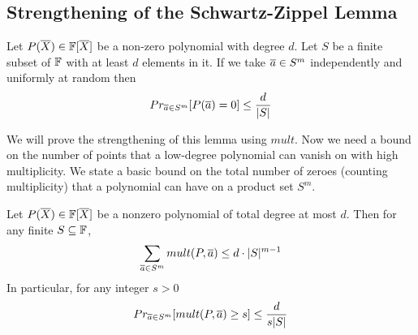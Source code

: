 \subsection{Strengthening of the Schwartz-Zippel Lemma}
\begin{theorem}\label{schwartzzippel}
	Let $P(\overline{X})\in \mathbb{F}[\overline{X}]$ be a non-zero polynomial with degree $d$. Let $S$ be a finite subset of $\mathbb{F}$ with at least $d$ elements in it. If we take $\overline{a}\in S^m$ independently and uniformly at random then $$Pr_{\overline{a}\in S^m}[P(\overline{a})=0]\leq \frac{d}{|S|}$$
\end{theorem}
We will prove the strengthening of this lemma using $mult$. Now we need a bound on the number of points that a low-degree polynomial can vanish on with high multiplicity. We state a basic bound on the total number of zeroes (counting multiplicity) that a polynomial can have on a product set $S^m$.
\begin{theorem}\label{multplicitybound}
	Let $P(\overline{X})\in \mathbb{F}[\overline{X}]$ be a nonzero polynomial of total degree at most $d$. Then for any finite $S\subseteq \mathbb{F}$, $$\sum_{\overline{a}\in S^m} mult(P,\overline{a})\leq d\cdot |S|^{m-1}$$In particular, for any integer $s>0$ $$Pr_{\overline{a}\in S^m}[mult(P,\overline{a})\geq s]\leq \frac{d}{s|S|}$$
\end{theorem}
